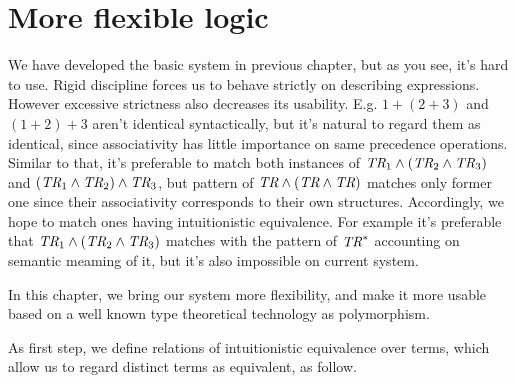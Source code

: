 \documentclass[12pt]{article}
\begin{document}
\section{More flexible logic}
We have developed the basic system in previous chapter,
but as you see, it's hard to use. Rigid discipline forces us to behave
strictly on describing expressions. However excessive strictness also
decreases its usability. E.g. $1+(2+3)$ and $(1+2)+3$ aren't identical
syntactically,
but it's natural to regard them as identical, since associativity has little
importance on same precedence operations. Similar to that, it's preferable
to match both instances of
$\text{\it TR}_1 \wedge (\text{\it TR}_2 \wedge \text{\it TR}_3)$ and
$(\text{\it TR}_1 \wedge \text{\it TR}_2) \wedge \text{\it TR}_3$, but
pattern of $\text{\it TR} \wedge (\text{\it TR} \wedge \text{\it TR})$
matches only former one since their associativity corresponds to their
own structures. Accordingly, we hope to match ones having intuitionistic
equivalence. For example it's preferable that
$\text{\it TR}_1 \wedge (\text{\it TR}_2 \wedge \text{\it TR}_3)$ matches
with the pattern of $\text{\it TR}^*$ accounting on semantic meaming of
it, but it's also impossible on current system.

In this chapter, we bring our system more flexibility, and make it more
usable based on a well known type theoretical technology as polymorphism.

As first step, we define relations of intuitionistic equivalence over
terms, which allow us to regard distinct terms as equivalent, as follow.
\end{document}
